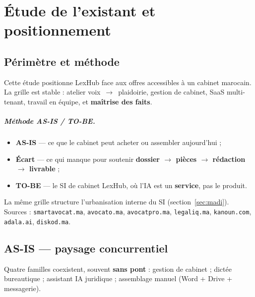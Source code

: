 \chapter{Étude de l'existant et positionnement}
\label{ch:etat-art}

\section{Périmètre et méthode}
\label{sec:etat-methode}

Cette étude positionne LexHub face aux offres accessibles à un cabinet marocain. La grille est stable : atelier voix~$\rightarrow$~plaidoirie, gestion de cabinet, SaaS multi-tenant, travail en équipe, et \textbf{maîtrise des faits}.

\paragraph{Méthode AS-IS / TO-BE.}
\begin{itemize}[leftmargin=1.4em]
  \item \textbf{AS-IS} --- ce que le cabinet peut acheter ou assembler aujourd'hui ;
  \item \textbf{Écart} --- ce qui manque pour soutenir \textbf{dossier $\rightarrow$ pièces $\rightarrow$ rédaction $\rightarrow$ livrable} ;
  \item \textbf{TO-BE} --- le SI de cabinet LexHub, où l'IA est un \textbf{service}, pas le produit.
\end{itemize}

La même grille structure l'urbanisation interne du SI (section~\ref{sec:madi}). Sources : \texttt{smartavocat.ma}, \texttt{avocato.ma}, \texttt{avocatpro.ma}, \texttt{legaliq.ma}, \texttt{kanoun.com}, \texttt{adala.ai}, \texttt{diskod.ma}.

\section{AS-IS --- paysage concurrentiel}
\label{sec:as-is-marche}

Quatre familles coexistent, souvent \textbf{sans pont} : gestion de cabinet ; dictée bureautique ; assistant IA juridique ; assemblage manuel (Word + Drive + messagerie).

